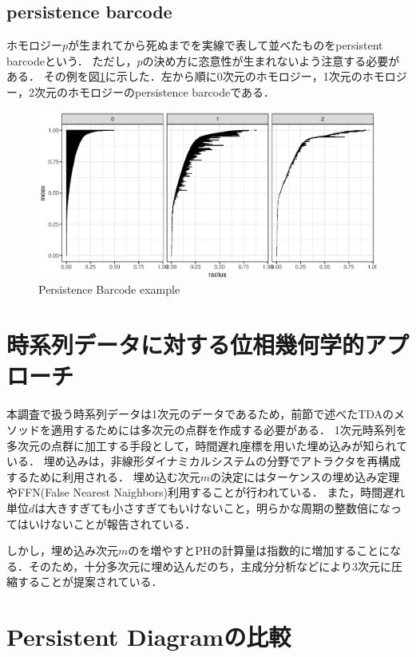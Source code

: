 \documentclass{jarticle}
\begin{document}
\subsection{persistence barcode}
ホモロジー$p$が生まれてから死ぬまでを実線で表して並べたものをpersistent barcodeという．
ただし，$p$の決め方に恣意性が生まれないよう注意する必要がある．
その例を図\ref{fig:PBex}に示した．左から順に0次元のホモロジー，1次元のホモロジー，2次元のホモロジーのpersistence barcodeである．
\begin{figure}[H]
	\begin{center}
		\includegraphics[width=12cm]{fig/PB_example.eps}
		\caption{Persistence Barcode example}
		\label{fig:PBex}
	\end{center}
\end{figure}


\section{時系列データに対する位相幾何学的アプローチ}
本調査で扱う時系列データは1次元のデータであるため，前節で述べたTDAのメソッドを適用するためには多次元の点群を作成する必要がある．
1次元時系列を多次元の点群に加工する手段として，時間遅れ座標を用いた埋め込みが知られている．
埋め込みは，非線形ダイナミカルシステムの分野でアトラクタを再構成するために利用される．
埋め込む次元$m$の決定にはターケンスの埋め込み定理やFFN(False Nearest Naighbors)利用することが行われている．
また，時間遅れ単位$d$は大きすぎても小さすぎてもいけないこと，明らかな周期の整数倍になってはいけないことが報告されている．

しかし，埋め込み次元$m$のを増やすとPHの計算量は指数的に増加することになる．そのため，十分多次元に埋め込んだのち，主成分分析などにより3次元に圧縮することが提案されている\cite{Truong2017}．

\section{Persistent Diagramの比較}
\end{document}

